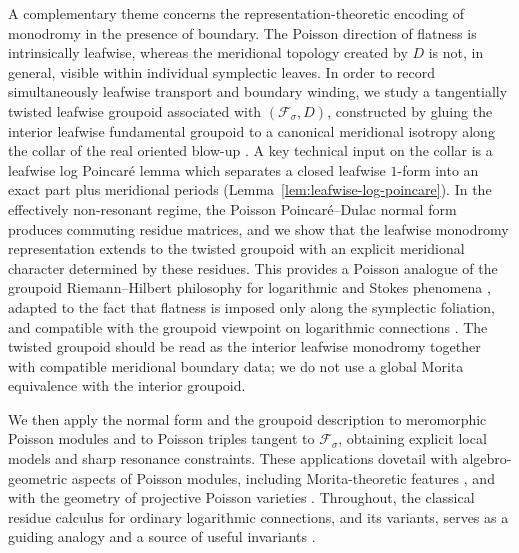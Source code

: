 \documentclass[11pt]{amsart}
\theoremstyle{plain}
\theoremstyle{definition}
\newcommand{\fol}{\mathcal{F}}
\theoremstyle{definition}
\begin{document}
A complementary theme concerns the representation-theoretic encoding of monodromy in the presence
of boundary. The Poisson direction of flatness is intrinsically leafwise, whereas the meridional
topology created by $D$ is not, in general, visible within individual symplectic leaves. In order
to record simultaneously leafwise transport and boundary winding, we study a tangentially twisted
leafwise groupoid associated with $(\fol_\sigma,D)$, constructed by gluing the interior leafwise
fundamental groupoid to a canonical meridional isotropy along the collar of the real oriented
blow-up \cite{PopescuPampu25}. A key technical input on the collar is a leafwise log Poincar\'e lemma
which separates a closed leafwise $1$-form into an exact part plus meridional periods (Lemma~\ref{lem:leafwise-log-poincare}).
In the effectively non-resonant regime, the Poisson Poincar\'e--Dulac normal form
produces commuting residue matrices, and we show that the leafwise monodromy representation extends
to the twisted groupoid with an explicit meridional character determined by these residues. This
provides a Poisson analogue of the groupoid Riemann--Hilbert philosophy for logarithmic and Stokes
phenomena \cite{GLP18,Sabbah13}, adapted to the fact that flatness is imposed only along the
symplectic foliation, and compatible with the groupoid viewpoint on logarithmic connections
\cite{Bischoff20,Bischoff22}. The twisted groupoid should be read as the interior leafwise monodromy together with compatible meridional boundary data; we do not use a global Morita equivalence with the interior groupoid.

We then apply the normal form and the groupoid description to meromorphic Poisson modules and to
Poisson triples tangent to $\fol_\sigma$, obtaining explicit local models and sharp resonance
constraints. These applications dovetail with algebro-geometric aspects of Poisson modules,
including Morita-theoretic features \cite{Cor20}, and with the geometry of projective Poisson
varieties \cite{Pym18}. Throughout, the classical residue calculus for ordinary logarithmic
connections, and its variants, serves as a guiding analogy and a source of useful invariants
\cite{Ohtsuki82}.
\end{document}
